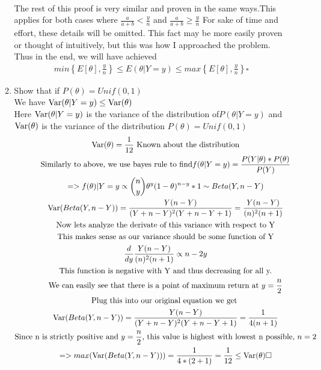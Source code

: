 \documentclass[11pt]{article}
\newcommand{\Var}{\mathop{\rm Var}}
\begin{document}
\begin{enumerate}
\begin{enumerate}
\begin{gather}
	\end{gather}
	The rest of this proof is very similar and proven in the same ways.This applies for both cases where $\frac{a}{a+b}<\frac{y}{n}$ and $\frac{a}{a+b}\ge\frac{y}{n}$ For sake of time and effort, these details will be omitted. This fact may be more easily proven or thought of intuitively, but this was how I approached the problem.\\
	Thus in the end, we will have achieved
	\begin{gather}
			min\left\{E[\theta],\frac{y}{n}\right\}\le E(\theta | Y = y) \le max\left\{E[\theta],\frac{y}{n}\right\} \square
	\end{gather}
	\item Show that if $P(\theta) = Unif(0,1)$\\
	We have $\Var(\theta|Y=y)\le \Var(\theta)$\\
	Here $\Var(\theta|Y=y)$ is the variance of the distribution of$ P(\theta |Y=y)$ and $\Var(\theta)$ is the variance of the distribution $P(\theta) = Unif(0,1)$
	\begin{gather}
		\Var(\theta)=\frac{1}{12} \text{ Known about the distribution}\\
		\text{Similarly to above, we use bayes rule to find} f(\theta|Y=y)=\frac{P(Y|\theta) * P(\theta)}{P(Y)}\\
		=> f(\theta)|Y=y \propto \binom{n}{y}\theta^y(1-\theta)^{n-y} * 1 \sim Beta(Y,n-Y)\\
		\Var(Beta(Y,n-Y)) = \frac{Y(n-Y)}{(Y+n-Y)^2(Y+n-Y+1)} = \frac{Y(n-Y)}{(n)^2(n+1)}\\
		\text{Now lets analyze the derivate of this variance with respect to Y}\\
		\text{This makes sense as our variance should be some function of Y}\\
		\frac{d}{dy}\frac{Y(n-Y)}{(n)^2(n+1)} \propto n-2y\\
		\text{This function is negative with Y and thus decreasing for all y.}\\
		\text{We can easily see that there is a point of maximum return at } y=\frac{n}{2}\\
		\text{Plug this into our original equation we get }\\
		\Var(Beta(Y,n-Y)) = \frac{Y(n-Y)}{(Y+n-Y)^2(Y+n-Y+1)} =\frac{1}{4(n+1)}\\
		\text{Since n is strictly positive and $y=\frac{n}{2}$, this value is highest with lowest n possible, } n=2\\
		=> max(\Var(Beta(Y,n-Y))) = \frac{1}{4*(2+1)} = \frac{1}{12} \le \Var(\theta) \square

\end{gather}
\end{enumerate}
\end{enumerate}
\end{document}
